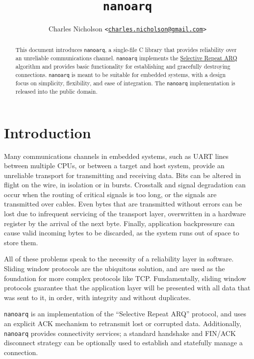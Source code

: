 \documentclass[11pt]{article}
\newcommand{\nanoarq}{\texttt{nanoarq}}
\begin{document}
\title{\nanoarq{}}
\author{Charles Nicholson \texttt{<\href{mailto:charles.nicholson@gmail.com}{charles.nicholson@gmail.com}>}}
\date{}
\maketitle

\begin{abstract}
    This document introduces \nanoarq{}, a single-file C library that provides reliability over an unreliable communications channel. \nanoarq{} implements the \href{https://en.wikipedia.org/wiki/Selective_Repeat_ARQ}{Selective Repeat ARQ}   algorithm and provides basic functionality for establishing and gracefully destroying connections. \nanoarq{} is meant to be suitable for embedded systems, with a design focus on simplicity, flexibility, and ease of integration. The \nanoarq{} implementation is released into the public domain.
\end{abstract}

\begin{spacing}{0.0}
\tableofcontents
\end{spacing}

\section{Introduction}
Many communications channels in embedded systems, such as UART lines between multiple CPUs, or between a target and host system, provide an unreliable transport for transmitting and receiving data. Bits can be altered in flight on the wire, in isolation or in bursts. Crosstalk and signal degradation can occur when the routing of critical signals is too long, or the signals are transmitted over cables. Even bytes that are transmitted without errors can be lost due to infrequent servicing of the transport layer, overwritten in a hardware register by the arrival of the next byte. Finally, application backpressure can cause valid incoming bytes to be discarded, as the system runs out of space to store them. \par
All of these problems speak to the necessity of a reliability layer in software. Sliding window protocols are the ubiquitous solution, and are used as the foundation for more complex protocols like TCP. Fundamentally, sliding window protocols guarantee that the application layer will be presented with all data that was sent to it, in order, with integrity and without duplicates. \par
\nanoarq{} is an implementation of the \enquote{Selective Repeat ARQ} protocol, and uses an explicit ACK mechanism to retransmit lost or corrupted data. Additionally, \nanoarq{} provides connectivity services; a standard handshake and FIN/ACK disconnect strategy can be optionally used to establish and statefully manage a connection.
\end{document}
